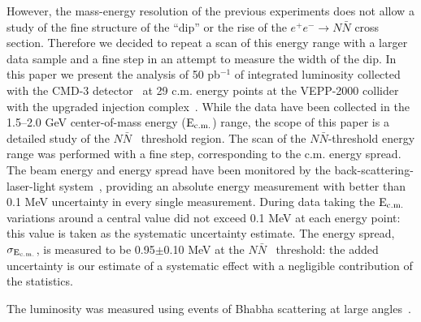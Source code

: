 \documentclass[12pt]{elsarticle}
\def\Ecm {\ensuremath{\rm E_{\rm c.m.}}}
\def\epem {\ensuremath{e^+ e^-}}
\def\NNbar {\ensuremath{N\bar N}}
\begin{document}
However, the mass-energy resolution of the previous experiments does not allow 
a study of the fine structure of the ``dip'' or the rise of the 
$\epem\to\NNbar$ cross section. Therefore we decided to repeat a scan
of this energy range with a larger data sample and a fine step in an
attempt to measure the width of the dip.    
In this paper we present the analysis of 
50 pb$^{-1}$ of  integrated luminosity collected with the CMD-3 
detector~\cite{sndcmd3} at 29 c.m. energy
points  at  the VEPP-2000 collider with the upgraded injection 
complex~\cite{vepp1,vepp2,vepp3,vepp4}.
While the data have been collected
in the 1.5--2.0 GeV center-of-mass energy (\Ecm) range, the scope of this paper 
is a detailed study of the \NNbar~ threshold region.  
The scan of the \NNbar-threshold energy range was performed with a fine step, 
corresponding to the c.m. energy spread.  
The beam energy and energy spread have been monitored by 
the back-scattering-laser-light system~\cite{laser1,laser2}, providing
an absolute energy measurement with better than 0.1 MeV uncertainty in every single measurement. 
During data taking the \Ecm~ variations around a central value did not exceed 
0.1 MeV at each energy point: this value is taken as the systematic uncertainty estimate. The energy spread, $\sigma_{\Ecm}$,  is measured to be
0.95$\pm$0.10 MeV at the \NNbar~ threshold: the added uncertainty is our
estimate of a systematic effect with a negligible contribution 
of the statistics.

The luminosity was measured using events of Bhabha scattering 
at large angles~\cite{lum}. 
%
\end{document}
